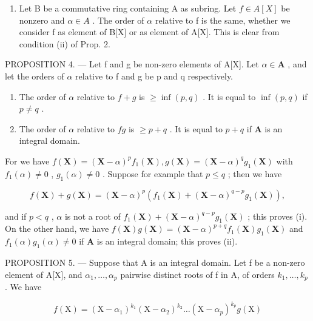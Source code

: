 \begin{enumerate}
\def\labelenumi{\arabic{enumi})}
\setcounter{enumi}{1}
\tightlist
\item
  Let B be a commutative ring containing A as subring. Let \(f \in A[X]\) be nonzero and \(\alpha \in A\) . The order of \(\alpha\) relative to f is the same, whether we consider f as element of B{[}X{]} or as element of A{[}X{]}. This is clear from condition (ii) of Prop. 2.
\end{enumerate}

PROPOSITION 4. --- Let f and g be non-zero elements of A{[}X{]}. Let \(\alpha \in \mathbf{A}\) , and let the orders of \(\alpha\) relative to f and g be p and q respectively.

\begin{enumerate}
\def\labelenumi{(\roman{enumi})}
\item
  The order of \(\alpha\) relative to \(f + g\) is \(\geqslant \inf(p, q)\) . It is equal to \(\inf(p, q)\) if \(p \neq q\) .
\item
  The order of \(\alpha\) relative to \(fg\) is \(\geqslant p + q\) . It is equal to \(p + q\) if \(\mathbf{A}\) is an integral domain.
\end{enumerate}

For we have \(f(\mathbf{X}) = (\mathbf{X} - \alpha)^p f_1(\mathbf{X}), g(\mathbf{X}) = (\mathbf{X} - \alpha)^q g_1(\mathbf{X})\) with \(f_1(\alpha) \neq 0\) , \(g_1(\alpha) \neq 0\) . Suppose for example that \(p \leqslant q\) ; then we have

\[
f (\mathbf {X}) + g (\mathbf {X}) = (\mathbf {X} - \alpha) ^ {p} \left(f _ {1} (\mathbf {X}) + (\mathbf {X} - \alpha) ^ {q - p} g _ {1} (\mathbf {X})\right),
\]

and if \(p < q\) , \(\alpha\) is not a root of \(f_1(\mathbf{X}) + (\mathbf{X} - \alpha)^{q - p} g_1(\mathbf{X})\) ; this proves (i). On the other hand, we have \(f(\mathbf{X})g(\mathbf{X}) = (\mathbf{X} - \alpha)^{p + q} f_1(\mathbf{X})g_1(\mathbf{X})\) and \(f_1(\alpha)g_1(\alpha) \neq 0\) if \(\mathbf{A}\) is an integral domain; this proves (ii).

PROPOSITION 5. --- Suppose that A is an integral domain. Let f be a non-zero element of A{[}X{]}, and \(\alpha_{1},\ldots,\alpha_{p}\) pairwise distinct roots of f in A, of orders \(k_{1},\ldots,k_{p}\) . We have

\[
f (\mathrm{X}) = \left(\mathrm{X} - \alpha_ {1}\right) ^ {k _ {1}} \left(\mathrm{X} - \alpha_ {2}\right) ^ {k _ {2}} \dots \left(\mathrm{X} - \alpha_ {p}\right) ^ {k _ {p}} g (\mathrm{X})
\]

